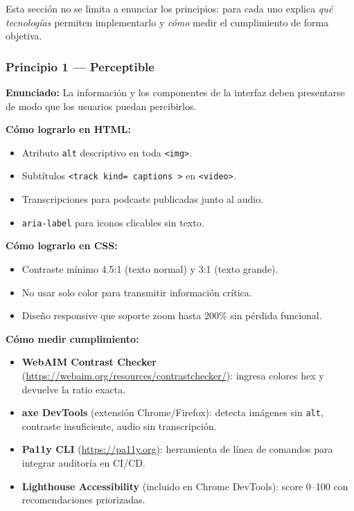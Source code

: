 \documentclass[11pt,a4paper,openany]{book}
\begin{document}
Esta sección no se limita a enunciar los principios: para cada uno
explica \emph{qué tecnologías} permiten implementarlo y \emph{cómo}
medir el cumplimiento de forma objetiva.

\subsubsection{Principio 1 --- Perceptible}

\textbf{Enunciado:} La información y los componentes de la interfaz
deben presentarse de modo que los usuarios puedan percibirlos.

\textbf{Cómo lograrlo en HTML:}
\begin{itemize}
\item Atributo \texttt{alt} descriptivo en toda \texttt{<img>}.
\item Subtítulos \texttt{<track kind= captions >} en \texttt{<video>}.
\item Transcripciones para podcasts publicadas junto al audio.
\item \texttt{aria-label} para iconos clicables sin texto.
\end{itemize}

\textbf{Cómo lograrlo en CSS:}
\begin{itemize}
\item Contraste mínimo 4.5:1 (texto normal) y 3:1 (texto grande).
\item No usar solo color para transmitir información crítica.
\item Diseño responsive que soporte zoom hasta 200\% sin pérdida
funcional.
\end{itemize}

\textbf{Cómo medir cumplimiento:}
\begin{itemize}
\item \textbf{WebAIM Contrast Checker} (\url{https://webaim.org/resources/contrastchecker/}):
ingresa colores hex y devuelve la ratio exacta.
\item \textbf{axe DevTools} (extensión Chrome/Firefox): detecta
imágenes sin \texttt{alt}, contraste insuficiente, audio sin
transcripción.
\item \textbf{Pa11y CLI} (\url{https://pa11y.org}): herramienta de
línea de comandos para integrar auditoría en CI/CD.
\item \textbf{Lighthouse Accessibility} (incluido en Chrome
DevTools): score 0--100 con recomendaciones priorizadas.
\end{itemize}
\end{document}
